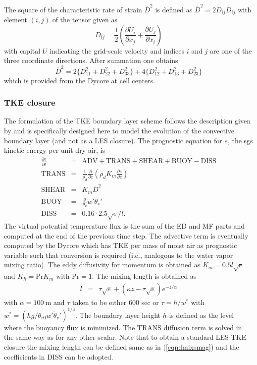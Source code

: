 \documentclass[dvipdfmx,a4paper,10pt]{article}
\begin{document}
The square of the characteristic rate of strain $\overline{D}^2$ is defined as $\overline{D}^2=2D_{ij}D_{ij}$ with element $(i,j)$ of the tensor given as
\begin{equation}
 D_{ij}=\frac{1}{2}(\frac{\partial U_i}{\partial x_j}+\frac{\partial U_j}{\partial x_i})
\end{equation}
with capital $U$ indicating the grid-scale velocity and indices $i$ and $j$ are one of the three coordinate directions. After summation one obtains 
\begin{equation}\label{eqn:def2}
 \overline{D}^2=2\{D_{11}^2+D_{22}^2+D_{33}^2\}+4\{D_{12}^2+D_{13}^2+D_{23}^2 \}
\end{equation}
which is provided from the Dycore at cell centers. 


\subsubsection{TKE closure}
The formulation of the TKE boundary layer scheme follows the description given by \cite{teixeira04} and is specifically designed here to model the evolution of the convective boundary layer (and not as a LES closure). The prognostic equation for $e$, the sgs kinetic energy per unit dry air, is
\begin{eqnarray}\label{eqn:tkebudget}
 \frac{\partial e}{\partial t}&=& \mathrm{ADV} + \mathrm{TRANS} + \mathrm{SHEAR} + \mathrm{BUOY} - \mathrm{DISS}\\
 \mathrm{TRANS} &=& \frac{1}{\rho_d}\frac{\partial}{\partial z} (\rho_d K_m  \frac{\partial e}{\partial z})\\
 \mathrm{SHEAR} &=& K_m \overline{D}^2 \\
 \mathrm{BUOY} &=& \frac{g}{\theta_v}\overline{w'\theta_v'}\\
 \mathrm{DISS}&=& 0.16\cdot 2.5\sqrt{e}/l.
\end{eqnarray}
The virtual potential temperature flux is the sum of the ED and MF parts and computed at the end of the previous time step. The advective term is eventually computed by the Dycore which has TKE per mass of moist air as prognostic variable such that conversion is required (i.e., analogous to the water vapor mixing ratio). The eddy diffusivity for momentum is obtained as $K_m=0.5 l \sqrt{e}$ and $K_h=\mathrm{Pr} K_m$ with $\mathrm{Pr}=1$. The mixing length is obtained as
\begin{eqnarray}
 l &=& \tau \sqrt{e} + (\kappa z - \tau \sqrt{e}) e^{-z/\alpha}
\end{eqnarray}
with $\alpha=100\mathrm{~m}$ and $\tau$ taken to be either 600 sec or $\tau=h/w^*$ with $w^*=(hg/\theta_{v0} \overline{w'\theta_v'})^{1/3}$. The boundary layer height $h$ is defined as the level where the buoyancy flux is minimized. The TRANS diffusion term is solved in the same way as for any other scalar. Note that to obtain a standard LES TKE closure the mixing length can be defined same as in (\ref{eqn:lmixsmag}) and the coefficients in DISS can be adopted. 
\end{document}
